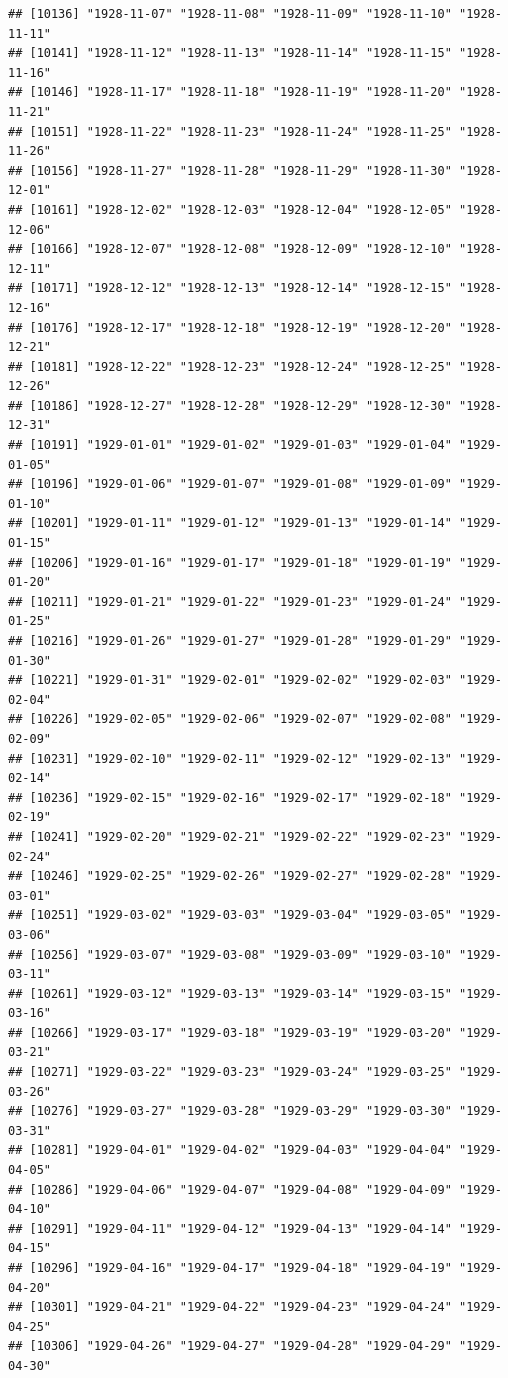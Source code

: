 \documentclass{article}\usepackage[]{graphicx}\usepackage[]{color}
\makeatletter
\newenvironment{kframe}{%
 \def\at@end@of@kframe{}%
 \ifinner\ifhmode%
  \def\at@end@of@kframe{\end{minipage}}%
  \begin{minipage}{\columnwidth}%
 \fi\fi%
 \def\FrameCommand##1{\hskip\@totalleftmargin \hskip-\fboxsep
 \colorbox{shadecolor}{##1}\hskip-\fboxsep
     \hskip-\linewidth \hskip-\@totalleftmargin \hskip\columnwidth}%
 \MakeFramed {\advance\hsize-\width
   \@totalleftmargin\z@ \linewidth\hsize
   \@setminipage}}%
 {\par\unskip\endMakeFramed%
 \at@end@of@kframe}
\newenvironment{knitrout}{}{} %
\makeatother
\begin{document}
\begin{description}
\begin{knitrout}
\begin{kframe}
\begin{verbatim}
## [10136] "1928-11-07" "1928-11-08" "1928-11-09" "1928-11-10" "1928-11-11"
## [10141] "1928-11-12" "1928-11-13" "1928-11-14" "1928-11-15" "1928-11-16"
## [10146] "1928-11-17" "1928-11-18" "1928-11-19" "1928-11-20" "1928-11-21"
## [10151] "1928-11-22" "1928-11-23" "1928-11-24" "1928-11-25" "1928-11-26"
## [10156] "1928-11-27" "1928-11-28" "1928-11-29" "1928-11-30" "1928-12-01"
## [10161] "1928-12-02" "1928-12-03" "1928-12-04" "1928-12-05" "1928-12-06"
## [10166] "1928-12-07" "1928-12-08" "1928-12-09" "1928-12-10" "1928-12-11"
## [10171] "1928-12-12" "1928-12-13" "1928-12-14" "1928-12-15" "1928-12-16"
## [10176] "1928-12-17" "1928-12-18" "1928-12-19" "1928-12-20" "1928-12-21"
## [10181] "1928-12-22" "1928-12-23" "1928-12-24" "1928-12-25" "1928-12-26"
## [10186] "1928-12-27" "1928-12-28" "1928-12-29" "1928-12-30" "1928-12-31"
## [10191] "1929-01-01" "1929-01-02" "1929-01-03" "1929-01-04" "1929-01-05"
## [10196] "1929-01-06" "1929-01-07" "1929-01-08" "1929-01-09" "1929-01-10"
## [10201] "1929-01-11" "1929-01-12" "1929-01-13" "1929-01-14" "1929-01-15"
## [10206] "1929-01-16" "1929-01-17" "1929-01-18" "1929-01-19" "1929-01-20"
## [10211] "1929-01-21" "1929-01-22" "1929-01-23" "1929-01-24" "1929-01-25"
## [10216] "1929-01-26" "1929-01-27" "1929-01-28" "1929-01-29" "1929-01-30"
## [10221] "1929-01-31" "1929-02-01" "1929-02-02" "1929-02-03" "1929-02-04"
## [10226] "1929-02-05" "1929-02-06" "1929-02-07" "1929-02-08" "1929-02-09"
## [10231] "1929-02-10" "1929-02-11" "1929-02-12" "1929-02-13" "1929-02-14"
## [10236] "1929-02-15" "1929-02-16" "1929-02-17" "1929-02-18" "1929-02-19"
## [10241] "1929-02-20" "1929-02-21" "1929-02-22" "1929-02-23" "1929-02-24"
## [10246] "1929-02-25" "1929-02-26" "1929-02-27" "1929-02-28" "1929-03-01"
## [10251] "1929-03-02" "1929-03-03" "1929-03-04" "1929-03-05" "1929-03-06"
## [10256] "1929-03-07" "1929-03-08" "1929-03-09" "1929-03-10" "1929-03-11"
## [10261] "1929-03-12" "1929-03-13" "1929-03-14" "1929-03-15" "1929-03-16"
## [10266] "1929-03-17" "1929-03-18" "1929-03-19" "1929-03-20" "1929-03-21"
## [10271] "1929-03-22" "1929-03-23" "1929-03-24" "1929-03-25" "1929-03-26"
## [10276] "1929-03-27" "1929-03-28" "1929-03-29" "1929-03-30" "1929-03-31"
## [10281] "1929-04-01" "1929-04-02" "1929-04-03" "1929-04-04" "1929-04-05"
## [10286] "1929-04-06" "1929-04-07" "1929-04-08" "1929-04-09" "1929-04-10"
## [10291] "1929-04-11" "1929-04-12" "1929-04-13" "1929-04-14" "1929-04-15"
## [10296] "1929-04-16" "1929-04-17" "1929-04-18" "1929-04-19" "1929-04-20"
## [10301] "1929-04-21" "1929-04-22" "1929-04-23" "1929-04-24" "1929-04-25"
## [10306] "1929-04-26" "1929-04-27" "1929-04-28" "1929-04-29" "1929-04-30"

\end{verbatim}
\end{kframe}
\end{knitrout}
\end{description}
\end{document}
